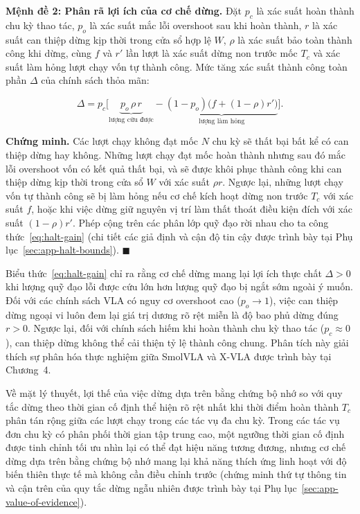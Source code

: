 \textbf{Mệnh đề 2: Phân rã lợi ích của cơ chế dừng.}\label{prop:halt-gain} Đặt $p_c$ là xác suất hoàn thành chu kỳ thao tác, $p_o$ là xác suất mắc lỗi overshoot sau khi hoàn thành, $r$ là xác suất can thiệp dừng kịp thời trong cửa sổ hợp lệ $W$, $\rho$ là xác suất bảo toàn thành công khi dừng, cùng $f$ và $r'$ lần lượt là xác suất dừng non trước mốc $T_c$ và xác suất làm hỏng lượt chạy vốn tự thành công. Mức tăng xác suất thành công toàn phần $\Delta$ của chính sách thỏa mãn:

\begin{equation}
\Delta = p_c \Big[ \underbrace{p_o\,\rho\,r}_{\text{lượng cứu được}} - \underbrace{(1 - p_o)\big(f + (1 - \rho)r'\big)}_{\text{lượng làm hỏng}} \Big].
\label{eq:halt-gain}
\end{equation}

\textbf{Chứng minh.} Các lượt chạy không đạt mốc $N$ chu kỳ sẽ thất bại bất kể có can thiệp dừng hay không. Những lượt chạy đạt mốc hoàn thành nhưng sau đó mắc lỗi overshoot vốn có kết quả thất bại, và sẽ được khôi phục thành công khi can thiệp dừng kịp thời trong cửa sổ $W$ với xác suất $\rho r$. Ngược lại, những lượt chạy vốn tự thành công sẽ bị làm hỏng nếu cơ chế kích hoạt dừng non trước $T_c$ với xác suất $f$, hoặc khi việc dừng giữ nguyên vị trí làm thất thoát điều kiện đích với xác suất $(1 - \rho)r'$. Phép cộng trên các phân lớp quỹ đạo rời nhau cho ta công thức~\eqref{eq:halt-gain} (chi tiết các giả định và cận độ tin cậy được trình bày tại Phụ lục~\ref{sec:app-halt-bounds}). $\blacksquare$

Biểu thức~\eqref{eq:halt-gain} chỉ ra rằng cơ chế dừng mang lại lợi ích thực chất $\Delta > 0$ khi lượng quỹ đạo lỗi được cứu lớn hơn lượng quỹ đạo bị ngắt sớm ngoài ý muốn. Đối với các chính sách VLA có nguy cơ overshoot cao ($p_o \to 1$), việc can thiệp dừng ngoại vi luôn đem lại giá trị dương rõ rệt miễn là độ bao phủ dừng đúng $r > 0$. Ngược lại, đối với chính sách hiếm khi hoàn thành chu kỳ thao tác ($p_c \approx 0$), can thiệp dừng không thể cải thiện tỷ lệ thành công chung. Phân tích này giải thích sự phân hóa thực nghiệm giữa SmolVLA và X-VLA được trình bày tại Chương~4.

Về mặt lý thuyết, lợi thế của việc dừng dựa trên bằng chứng bộ nhớ so với quy tắc dừng theo thời gian cố định thể hiện rõ rệt nhất khi thời điểm hoàn thành $T_c$ phân tán rộng giữa các lượt chạy trong các tác vụ đa chu kỳ. Trong các tác vụ đơn chu kỳ có phân phối thời gian tập trung cao, một ngưỡng thời gian cố định được tinh chỉnh tối ưu nhìn lại có thể đạt hiệu năng tương đương, nhưng cơ chế dừng dựa trên bằng chứng bộ nhớ mang lại khả năng thích ứng linh hoạt với độ biến thiên thực tế mà không cần điều chỉnh trước (chứng minh thứ tự thông tin và cận trên của quy tắc dừng ngẫu nhiên được trình bày tại Phụ lục~\ref{sec:app-value-of-evidence}).
